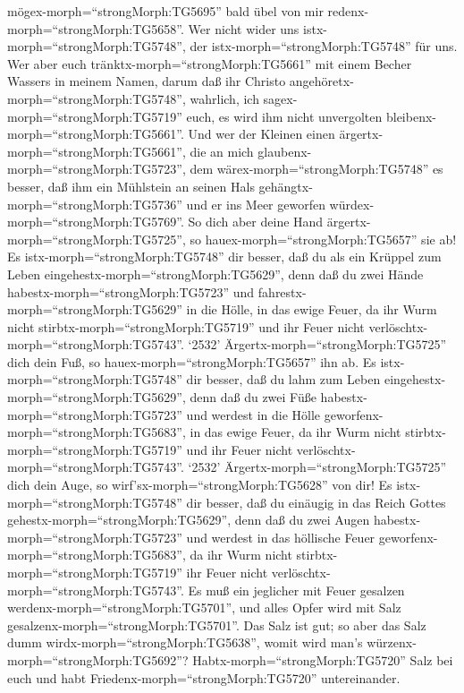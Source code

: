 mögex-morph=``strongMorph:TG5695'' bald übel von mir
redenx-morph=``strongMorph:TG5658''.  Wer nicht wider uns
istx-morph=``strongMorph:TG5748'', der istx-morph=``strongMorph:TG5748''
für uns.  Wer aber euch
tränktx-morph=``strongMorph:TG5661'' mit einem Becher Wassers in meinem
Namen, darum daß ihr Christo angehöretx-morph=``strongMorph:TG5748'',
wahrlich, ich sagex-morph=``strongMorph:TG5719'' euch, es wird ihm nicht
unvergolten bleibenx-morph=``strongMorph:TG5661''.  Und wer
der Kleinen einen ärgertx-morph=``strongMorph:TG5661'', die an mich
glaubenx-morph=``strongMorph:TG5723'', dem
wärex-morph=``strongMorph:TG5748'' es besser, daß ihm ein Mühlstein an
seinen Hals gehängtx-morph=``strongMorph:TG5736'' und er ins Meer
geworfen würdex-morph=``strongMorph:TG5769''.  So dich aber
deine Hand ärgertx-morph=``strongMorph:TG5725'', so
hauex-morph=``strongMorph:TG5657'' sie ab! Es
istx-morph=``strongMorph:TG5748'' dir besser, daß du als ein Krüppel zum
Leben eingehestx-morph=``strongMorph:TG5629'', denn daß du zwei Hände
habestx-morph=``strongMorph:TG5723'' und
fahrestx-morph=``strongMorph:TG5629'' in die Hölle, in das ewige Feuer,
 da ihr Wurm nicht stirbtx-morph=``strongMorph:TG5719'' und
ihr Feuer nicht verlöschtx-morph=``strongMorph:TG5743''. 
`2532' Ärgertx-morph=``strongMorph:TG5725'' dich dein Fuß, so
hauex-morph=``strongMorph:TG5657'' ihn ab. Es
istx-morph=``strongMorph:TG5748'' dir besser, daß du lahm zum Leben
eingehestx-morph=``strongMorph:TG5629'', denn daß du zwei Füße
habestx-morph=``strongMorph:TG5723'' und werdest in die Hölle
geworfenx-morph=``strongMorph:TG5683'', in das ewige Feuer,
 da ihr Wurm nicht stirbtx-morph=``strongMorph:TG5719'' und
ihr Feuer nicht verlöschtx-morph=``strongMorph:TG5743''. 
`2532' Ärgertx-morph=``strongMorph:TG5725'' dich dein Auge, so
wirf'sx-morph=``strongMorph:TG5628'' von dir! Es
istx-morph=``strongMorph:TG5748'' dir besser, daß du einäugig in das
Reich Gottes gehestx-morph=``strongMorph:TG5629'', denn daß du zwei
Augen habestx-morph=``strongMorph:TG5723'' und werdest in das höllische
Feuer geworfenx-morph=``strongMorph:TG5683'',  da ihr Wurm
nicht stirbtx-morph=``strongMorph:TG5719'' ihr Feuer nicht
verlöschtx-morph=``strongMorph:TG5743''.  Es muß ein
jeglicher mit Feuer gesalzen werdenx-morph=``strongMorph:TG5701'', und
alles Opfer wird mit Salz gesalzenx-morph=``strongMorph:TG5701''.
 Das Salz ist gut; so aber das Salz dumm
wirdx-morph=``strongMorph:TG5638'', womit wird man's
würzenx-morph=``strongMorph:TG5692''? Habtx-morph=``strongMorph:TG5720''
Salz bei euch und habt Friedenx-morph=``strongMorph:TG5720''
untereinander.

